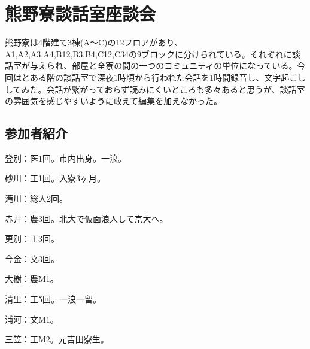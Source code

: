 \section{熊野寮談話室座談会}\label{danwashituzadankai}
熊野寮は4階建て3棟(A～C)の12フロアがあり、A1,A2,A3,A4,B12,B3,B4,C12,C34の9ブロックに分けられている。それぞれに談話室が与えられ、部屋と全寮の間の一つのコミュニティの単位になっている。今回はとある階の談話室で深夜1時頃から行われた会話を1時間録音し、文字起こししてみた。会話が繋がっておらず読みにくいところも多々あると思うが、談話室の雰囲気を感じやすいように敢えて編集を加えなかった。
\subsection{参加者紹介}

登別：医1回。市内出身。一浪。

砂川：工1回。入寮3ヶ月。


滝川：総人2回。


赤井：農3回。北大で仮面浪人して京大へ。


更別：工3回。


今金：文3回。


大樹：農M1。


清里：工5回。一浪一留。


浦河：文M1。


三笠：工M2。元吉田寮生。


